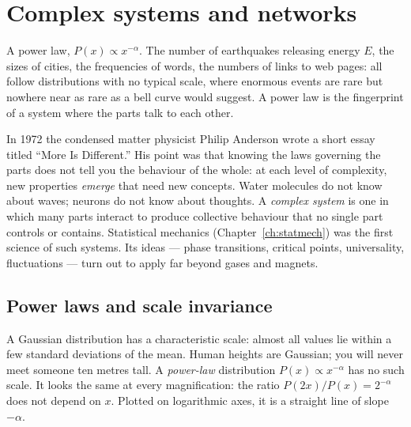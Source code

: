 \chapter{Complex systems and networks}
\label{ch:complex}



\begin{prototype}
A power law, $P(x)\propto x^{-\alpha}$. The number of earthquakes releasing energy $E$, the sizes of cities, the frequencies of words, the numbers of links to web pages: all follow distributions with no typical scale, where enormous events are rare but nowhere near as rare as a bell curve would suggest. A power law is the fingerprint of a system where the parts talk to each other.
\end{prototype}

In 1972 the condensed matter physicist Philip Anderson wrote a short essay titled ``More Is Different.'' His point was that knowing the laws governing the parts does not tell you the behaviour of the whole: at each level of complexity, new properties \emph{emerge} that need new concepts. Water molecules do not know about waves; neurons do not know about thoughts. A \emph{complex system} is one in which many parts interact to produce collective behaviour that no single part controls or contains. Statistical mechanics (Chapter~\ref{ch:statmech}) was the first science of such systems. Its ideas --- phase transitions, critical points, universality, fluctuations --- turn out to apply far beyond gases and magnets.

\section{Power laws and scale invariance}

A Gaussian distribution has a characteristic scale: almost all values lie within a few standard deviations of the mean. Human heights are Gaussian; you will never meet someone ten metres tall. A \emph{power-law} distribution $P(x)\propto x^{-\alpha}$ has no such scale. It looks the same at every magnification: the ratio $P(2x)/P(x) = 2^{-\alpha}$ does not depend on $x$. Plotted on logarithmic axes, it is a straight line of slope $-\alpha$.

